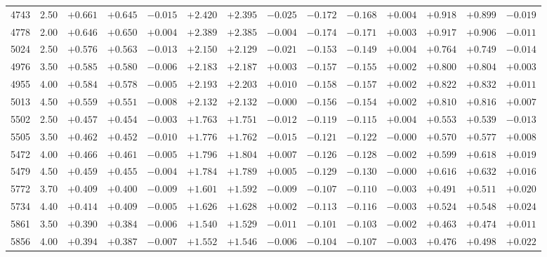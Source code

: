 \documentclass[]{aa}
\begin{document}
\begin{appendix}
\begin{table*}
\begin{center}
\begin{tabular}{llllllllllllll}
4743  &2.50 & $+0.661$ &$ +0.645$ &$ -0.015$ &$ +2.420$ &$ +2.395$ &$ -0.025$ &$ -0.172$ &$ -0.168$ &$ +0.004$ &$ +0.918$ &$ +0.899$ &$ -0.019$\\
4778  &2.00 & $+0.646$ &$ +0.650$ &$ +0.004$ &$ +2.389$ &$ +2.385$ &$ -0.004$ &$ -0.174$ &$ -0.171$ &$ +0.003$ &$ +0.917$ &$ +0.906$ &$ -0.011$\\
5024  &2.50 & $+0.576$ &$ +0.563$ &$ -0.013$ &$ +2.150$ &$ +2.129$ &$ -0.021$ &$ -0.153$ &$ -0.149$ &$ +0.004$ &$ +0.764$ &$ +0.749$ &$ -0.014$\\
4976  &3.50 & $+0.585$ &$ +0.580$ &$ -0.006$ &$ +2.183$ &$ +2.187$ &$ +0.003$ &$ -0.157$ &$ -0.155$ &$ +0.002$ &$ +0.800$ &$ +0.804$ &$ +0.003$\\
4955  &4.00 & $+0.584$ &$ +0.578$ &$ -0.005$ &$ +2.193$ &$ +2.203$ &$ +0.010$ &$ -0.158$ &$ -0.157$ &$ +0.002$ &$ +0.822$ &$ +0.832$ &$ +0.011$\\
5013  &4.50 & $+0.559$ &$ +0.551$ &$ -0.008$ &$ +2.132$ &$ +2.132$ &$ -0.000$ &$ -0.156$ &$ -0.154$ &$ +0.002$ &$ +0.810$ &$ +0.816$ &$ +0.007$\\
5502  &2.50 & $+0.457$ &$ +0.454$ &$ -0.003$ &$ +1.763$ &$ +1.751$ &$ -0.012$ &$ -0.119$ &$ -0.115$ &$ +0.004$ &$ +0.553$ &$ +0.539$ &$ -0.013$\\
5505  &3.50 & $+0.462$ &$ +0.452$ &$ -0.010$ &$ +1.776$ &$ +1.762$ &$ -0.015$ &$ -0.121$ &$ -0.122$ &$ -0.000$ &$ +0.570$ &$ +0.577$ &$ +0.008$\\
5472  &4.00 & $+0.466$ &$ +0.461$ &$ -0.005$ &$ +1.796$ &$ +1.804$ &$ +0.007$ &$ -0.126$ &$ -0.128$ &$ -0.002$ &$ +0.599$ &$ +0.618$ &$ +0.019$\\
5479  &4.50 & $+0.459$ &$ +0.455$ &$ -0.004$ &$ +1.784$ &$ +1.789$ &$ +0.005$ &$ -0.129$ &$ -0.130$ &$ -0.000$ &$ +0.616$ &$ +0.632$ &$ +0.016$\\
5772  &3.70 & $+0.409$ &$ +0.400$ &$ -0.009$ &$ +1.601$ &$ +1.592$ &$ -0.009$ &$ -0.107$ &$ -0.110$ &$ -0.003$ &$ +0.491$ &$ +0.511$ &$ +0.020$\\
5734  &4.40 & $+0.414$ &$ +0.409$ &$ -0.005$ &$ +1.626$ &$ +1.628$ &$ +0.002$ &$ -0.113$ &$ -0.116$ &$ -0.003$ &$ +0.524$ &$ +0.548$ &$ +0.024$\\
5861  &3.50 & $+0.390$ &$ +0.384$ &$ -0.006$ &$ +1.540$ &$ +1.529$ &$ -0.011$ &$ -0.101$ &$ -0.103$ &$ -0.002$ &$ +0.463$ &$ +0.474$ &$ +0.011$\\
5856  &4.00 & $+0.394$ &$ +0.387$ &$ -0.007$ &$ +1.552$ &$ +1.546$ &$ -0.006$ &$ -0.104$ &$ -0.107$ &$ -0.003$ &$ +0.476$ &$ +0.498$ &$ +0.022$\\

\end{tabular}
\end{center}
\end{table*}
\end{appendix}
\end{document}
